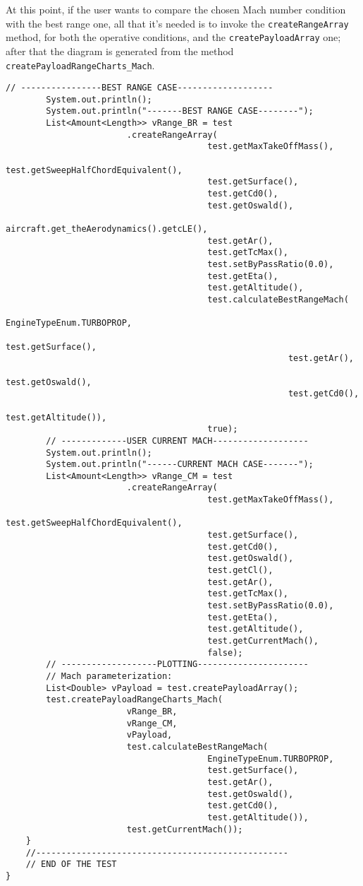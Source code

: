 \bigskip
\noindent
At this point, if the user wants to compare the chosen Mach number condition with the best range one, all that it’s needed is to invoke the \lstinline[language=Java]!createRangeArray! method, for both the operative conditions, and the \lstinline[language=Java]!createPayloadArray! one; after that the diagram is generated from the method \lstinline[language=Java]!createPayloadRangeCharts_Mach!.

\bigskip
\begin{lstlisting}[caption={Excerpt of the ATR-72 Payload-Range test - Payload-Range diagram evaluation and plot}, captionpos=b, tabsize=2]
		// ----------------BEST RANGE CASE-------------------
		System.out.println();
		System.out.println("-------BEST RANGE CASE--------");
		List<Amount<Length>> vRange_BR = test
						.createRangeArray(
										test.getMaxTakeOffMass(),
										test.getSweepHalfChordEquivalent(),
										test.getSurface(),
										test.getCd0(),
										test.getOswald(),
										aircraft.get_theAerodynamics().getcLE(),
										test.getAr(),
										test.getTcMax(),
										test.setByPassRatio(0.0),
										test.getEta(),
										test.getAltitude(),
										test.calculateBestRangeMach(
														EngineTypeEnum.TURBOPROP,
														test.getSurface(),
														test.getAr(),
														test.getOswald(),
														test.getCd0(),
														test.getAltitude()),
										true);		
		// -------------USER CURRENT MACH-------------------
		System.out.println();
		System.out.println("------CURRENT MACH CASE-------");
		List<Amount<Length>> vRange_CM = test
						.createRangeArray(
										test.getMaxTakeOffMass(),
										test.getSweepHalfChordEquivalent(),
										test.getSurface(),
										test.getCd0(),
										test.getOswald(),
										test.getCl(),
										test.getAr(),
										test.getTcMax(),
										test.setByPassRatio(0.0),
										test.getEta(),
										test.getAltitude(),
										test.getCurrentMach(),
										false);
		// -------------------PLOTTING----------------------	
		// Mach parameterization:
		List<Double> vPayload = test.createPayloadArray();
		test.createPayloadRangeCharts_Mach(
						vRange_BR,
						vRange_CM,
						vPayload,
						test.calculateBestRangeMach(
										EngineTypeEnum.TURBOPROP,
										test.getSurface(),
										test.getAr(),
										test.getOswald(),
										test.getCd0(),
										test.getAltitude()),
						test.getCurrentMach());
	}
	//--------------------------------------------------
	// END OF THE TEST
} 
\end{lstlisting}

